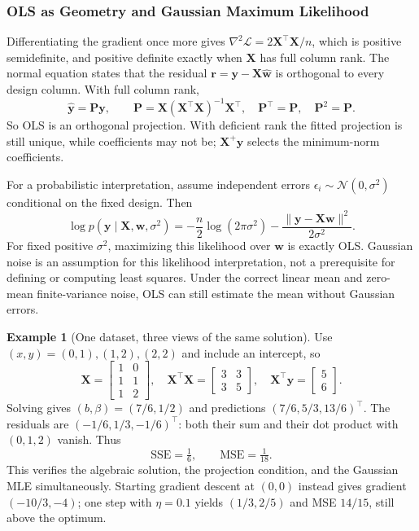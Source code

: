 \documentclass[11pt,twoside]{article}
\numberwithin{equation}{section}
\newcommand{\vect}[1]{\bm{#1}}
\newcommand{\mat}[1]{\bm{#1}}
\newcommand{\Loss}{\mathcal{L}}
\theoremstyle{plain}
\theoremstyle{definition}
\newtheorem{example}[theorem]{Example}
\theoremstyle{remark}
\begin{document}
\subsubsection{OLS as Geometry and Gaussian Maximum Likelihood}
\label{sec:ols-geometry}
Differentiating the gradient once more gives $\nabla^2\Loss=2\mat X^\top\mat X/n$, which is positive semidefinite, and positive definite exactly when $\mat X$ has full column rank. The normal equation states that the residual $\vect r=\vect y-\mat X\hat{\vect w}$ is orthogonal to every design column. With full column rank,
\[
\hat{\vect y}=\mat P\vect y,\qquad
\mat P=\mat X(\mat X^\top\mat X)^{-1}\mat X^\top,
\quad \mat P^\top=\mat P,\quad \mat P^2=\mat P.
\]
So OLS is an orthogonal projection. With deficient rank the fitted projection is still unique, while coefficients may not be; $\mat X^+\vect y$ selects the minimum-norm coefficients.

For a probabilistic interpretation, assume independent errors $\epsilon_i\sim\mathcal N(0,\sigma^2)$ conditional on the fixed design. Then
\[
\log p(\vect y\mid\mat X,\vect w,\sigma^2)
=-\frac n2\log(2\pi\sigma^2)-\frac{\|\vect y-\mat X\vect w\|^2}{2\sigma^2}.
\]
For fixed positive $\sigma^2$, maximizing this likelihood over $\vect w$ is exactly OLS. Gaussian noise is an assumption for this likelihood interpretation, not a prerequisite for defining or computing least squares. Under the correct linear mean and zero-mean finite-variance noise, OLS can still estimate the mean without Gaussian errors.

\begin{example}[One dataset, three views of the same solution]
Use $(x,y)=(0,1),(1,2),(2,2)$ and include an intercept, so
\[
\mat X=\begin{bmatrix}1&0\\1&1\\1&2\end{bmatrix},\quad
\mat X^\top\mat X=\begin{bmatrix}3&3\\3&5\end{bmatrix},\quad
\mat X^\top\vect y=\begin{bmatrix}5\\6\end{bmatrix}.
\]
Solving gives $(b,\beta)=(7/6,1/2)$ and predictions $(7/6,5/3,13/6)^\top$. The residuals are $(-1/6,1/3,-1/6)^\top$: both their sum and their dot product with $(0,1,2)$ vanish. Thus
\[
\mathrm{SSE}=\tfrac16,\qquad \mathrm{MSE}=\tfrac1{18}.
\]
This verifies the algebraic solution, the projection condition, and the Gaussian MLE simultaneously. Starting gradient descent at $(0,0)$ instead gives gradient $(-10/3,-4)$; one step with $\eta=0.1$ yields $(1/3,2/5)$ and MSE $14/15$, still above the optimum.
\end{example}
\end{document}
